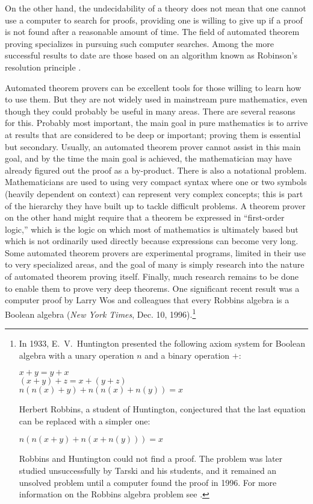 On the other hand, the undecidability of a theory does not mean that one cannot
use a computer to search for proofs, providing one is willing to give up if a
proof is not found after a reasonable amount of time.  The field of automated
theorem proving specializes in pursuing such
computer searches.  Among the more successful results to date are those based
on an algorithm known as Robinson's resolution principle
\cite{Robinson}.

Automated theorem provers can be excellent tools for those willing to learn
how to use them.  But they are not widely used in mainstream pure
mathematics, even though they could probably be useful in many areas.  There
are several reasons for this.  Probably most important, the main goal in pure
mathematics is to arrive at results that are considered to be deep or
important; proving them is essential but secondary.  Usually, an automated
theorem prover cannot assist in this main goal, and by the time the main goal
is achieved, the mathematician may have already figured out the proof as a
by-product.  There is also a notational problem.  Mathematicians are used to
using very compact syntax where one or two symbols (heavily dependent on
context) can represent very complex concepts; this is part of the
hierarchy they have built up to tackle difficult problems.  A
theorem prover on the other hand might require that a theorem be expressed in
``first-order logic,'' which is the logic on which
most of mathematics is ultimately based but which is not ordinarily used
directly because expressions can become very long.  Some automated theorem
provers are experimental programs, limited in their use to very specialized
areas, and the goal of many is simply research into the nature of automated
theorem proving itself.  Finally, much research remains to be done to enable
them to prove very deep theorems.  One significant recent result was a
computer proof by Larry Wos and colleagues that every Robbins
algebra is a Boolean  algebra
({\em New York Times}, Dec. 10, 1996).\footnote{In 1933, E.~V.\
Huntington
presented the following axiom system for
Boolean algebra with a unary operation $n$ and a binary operation $+$:
\begin{center}
    $x + y = y + x$ \\
    $(x + y) + z = x + (y + z)$ \\
    $n(n(x) + y) + n(n(x) + n(y)) = x$
\end{center}
Herbert Robbins, a student of Huntington, conjectured
that the last equation can be replaced with a simpler one:
\begin{center}
    $n(n(x + y) + n(x + n(y))) = x$
\end{center}
Robbins and Huntington could not find a proof.  The problem was
later studied unsuccessfully by Tarski and his
students, and it remained an unsolved problem until a
computer found the proof in 1996.  For more information on
the Robbins algebra problem see \cite{Wos}.}

